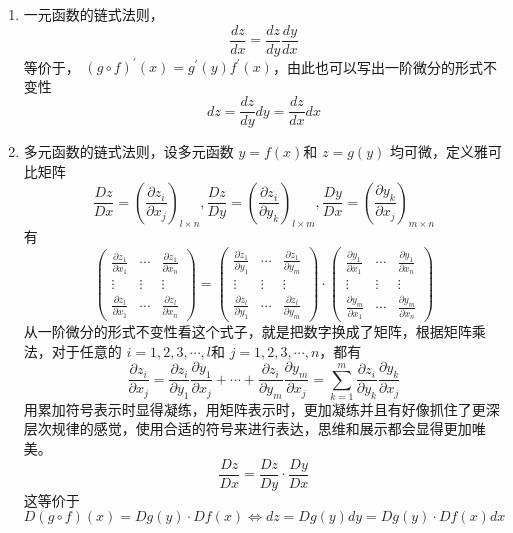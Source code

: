 \begin{enumerate}
    \item  一元函数的链式法则，
    $$
    \frac{dz}{dx}=\frac{dz}{dy}\frac{dy}{dx}
    $$
    等价于， $ (g\circ f)^\prime(x)=g^\prime(y)f^\prime(x)$，由此也可以写出一阶微分的形式不变性
    $$
    dz=\frac{dz}{dy}dy=\frac{dz}{dx}dx
    $$
    \item 多元函数的链式法则，设多元函数 $y = f(x)$和 $z = g(y)$ 均可微，定义雅可比矩阵
    $$
    \frac{Dz}{Dx}=\left(\frac{\partial z_i}{\partial x_j}\right)_{l\times n},\frac{Dz}{Dy}=\left(\frac{\partial z_i}{\partial y_k}\right)_{l\times m},\frac{Dy}{Dx}=\left(\frac{\partial y_k}{\partial x_j}\right)_{m\times n}
    $$
    有
    $$
    \left.\left(\begin{array}{ccc}\frac{\partial z_1}{\partial x_1}&\cdots&\frac{\partial z_1}{\partial x_n}\\\vdots&\vdots&\vdots\\\frac{\partial z_l}{\partial x_1}&\cdots&\frac{\partial z_l}{\partial x_n}\end{array}\right.\right)=\left(\begin{array}{ccc}\frac{\partial z_1}{\partial y_1}&\cdots&\frac{\partial z_1}{\partial y_m}\\\vdots&\vdots&\vdots\\\frac{\partial z_l}{\partial y_1}&\cdots&\frac{\partial z_l}{\partial y_m}\end{array}\right)\cdot\left(\begin{array}{ccc}\frac{\partial y_1}{\partial x_1}&\cdots&\frac{\partial y_1}{\partial x_n}\\\vdots&\vdots&\vdots\\\frac{\partial y_m}{\partial x_1}&\cdots&\frac{\partial y_m}{\partial x_n}\end{array}\right)
    $$
    从一阶微分的形式不变性看这个式子，就是把数字换成了矩阵，根据矩阵乘法，对于任意的 $i = 1,2,3, \cdots, l$和 $j = 1,2,3,\cdots,n$，都有
    $$
    \frac{\partial z_i}{\partial x_j}=\frac{\partial z_i}{\partial y_1}\frac{\partial y_1}{\partial x_j}+\cdots+\frac{\partial z_i}{\partial y_m}\frac{\partial y_m}{\partial x_j}=\sum_{k=1}^m\frac{\partial z_i}{\partial y_k}\frac{\partial y_k}{\partial x_j}
    $$
    用累加符号表示时显得凝练，用矩阵表示时，更加凝练并且有好像抓住了更深层次规律的感觉，使用合适的符号来进行表达，思维和展示都会显得更加唯美。
    $$
    \frac{Dz}{Dx}=\frac{Dz}{Dy}\cdot\frac{Dy}{Dx}
    $$
    这等价于
    $$
    D (g \circ f )(x) = Dg(y) \cdot Df(x) \Leftrightarrow  dz=Dg(y)dy=Dg(y)\cdot Df(x)dx
    $$
\end{enumerate}

